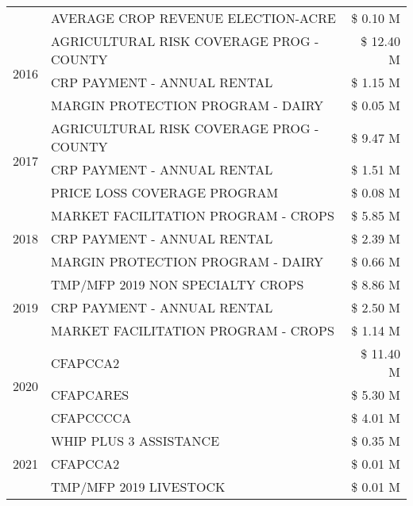 \begin{tabular}{llr}
 & AVERAGE CROP REVENUE ELECTION-ACRE & \$ 0.10 M \\
\cline{1-3}
\multirow[t]{3}{*}{2016} & AGRICULTURAL RISK COVERAGE PROG - COUNTY & \$ 12.40 M \\
 & CRP PAYMENT - ANNUAL RENTAL & \$ 1.15 M \\
 & MARGIN PROTECTION PROGRAM - DAIRY & \$ 0.05 M \\
\cline{1-3}
\multirow[t]{3}{*}{2017} & AGRICULTURAL RISK COVERAGE PROG - COUNTY & \$ 9.47 M \\
 & CRP PAYMENT - ANNUAL RENTAL & \$ 1.51 M \\
 & PRICE LOSS COVERAGE PROGRAM & \$ 0.08 M \\
\cline{1-3}
\multirow[t]{3}{*}{2018} & MARKET FACILITATION PROGRAM - CROPS & \$ 5.85 M \\
 & CRP PAYMENT - ANNUAL RENTAL & \$ 2.39 M \\
 & MARGIN PROTECTION PROGRAM - DAIRY & \$ 0.66 M \\
\cline{1-3}
\multirow[t]{3}{*}{2019} & TMP/MFP 2019 NON SPECIALTY CROPS & \$ 8.86 M \\
 & CRP PAYMENT - ANNUAL RENTAL & \$ 2.50 M \\
 & MARKET FACILITATION PROGRAM - CROPS & \$ 1.14 M \\
\cline{1-3}
\multirow[t]{3}{*}{2020} & CFAPCCA2 & \$ 11.40 M \\
 & CFAPCARES & \$ 5.30 M \\
 & CFAPCCCCA & \$ 4.01 M \\
\cline{1-3}
\multirow[t]{3}{*}{2021} & WHIP PLUS 3 ASSISTANCE & \$ 0.35 M \\
 & CFAPCCA2 & \$ 0.01 M \\
 & TMP/MFP 2019 LIVESTOCK & \$ 0.01 M \\
\cline{1-3}
\bottomrule
\end{tabular}
